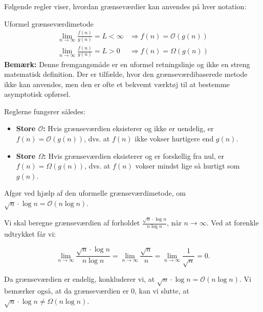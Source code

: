         Følgende regler viser, hvordan grænseværdier kan anvendes på hver notation:
       

        \begin{custombox}{Uformel grænseværdimetode}
            \[
                \begin{array}{ll}
                \displaystyle \lim_{n \to \infty} \frac{f(n)}{g(n)} = L<\infty & \Rightarrow f(n) = \mathcal{O}(g(n)) \\[10pt]
                \displaystyle \lim_{n \to \infty} \frac{f(n)}{g(n)} = L>0 & \Rightarrow f(n) = \Omega(g(n))
                \end{array}
                \]
                \medskip
                \textbf{Bemærk:} Denne fremgangsmåde er en uformel retningslinje og ikke en streng matematisk definition. Der er tilfælde, hvor den grænseværdibaserede metode ikke kan anvendes, men den er ofte et bekvemt værktøj til at bestemme asymptotisk opførsel.
        \end{custombox}
        
        Reglerne fungerer således:
        \begin{itemize}
            \item \textbf{Store \(\mathcal{O}\):} Hvis grænseværdien eksisterer og ikke er uendelig, er \( f(n) = \mathcal{O}(g(n)) \), dvs. at \( f(n) \) ikke vokser hurtigere end \( g(n) \).
            \item \textbf{Store \(\Omega\):} Hvis grænseværdien eksisterer og er forskellig fra nul, er \( f(n) = \Omega(g(n)) \), dvs. at \( f(n) \) vokser mindst lige så hurtigt som \( g(n) \).
        \end{itemize}
        
        \begin{example}
            Afgør ved hjælp af den uformelle grænseværdimetode, om $\sqrt{n} \cdot \log n=\mathcal{O}(n \log n)$.
        \end{example}

        \begin{solution}
            Vi skal beregne grænseværdien af forholdet \( \frac{\sqrt{n} \cdot \log n}{n \log n} \), når \( n \to \infty \). Ved at forenkle udtrykket får vi:
            
            \[
            \lim_{n \to \infty} \frac{\sqrt{n} \cdot \log n}{n \log n} = \lim_{n \to \infty} \frac{\sqrt{n}}{n} = \lim_{n \to \infty} \frac{1}{\sqrt{n}} = 0.
            \]
            
            Da grænseværdien er endelig, konkluderer vi, at \( \sqrt{n} \cdot \log n = \mathcal{O}(n \log n) \). Vi bemærker også, at da grænseværdien er 0, kan vi slutte, at \( \sqrt{n} \cdot \log n \neq \Omega(n \log n) \).
            
        \end{solution}

